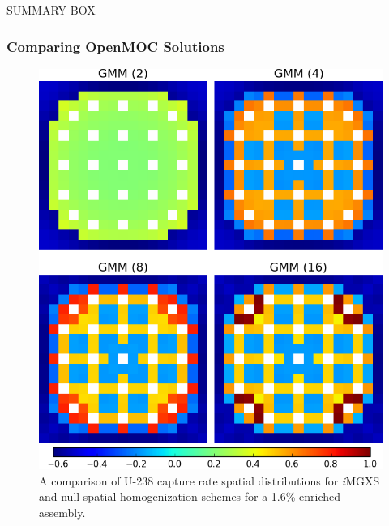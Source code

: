 \clearpage

SUMMARY BOX

\subsubsection{Comparing OpenMOC Solutions}
\label{subsec:chap11-imgxs-capt-rates-compare}

\begin{figure}[h!]
\centering
\includegraphics[width=0.9\linewidth]{figures/results/compare/assm-16/compare-capt}
\vspace{2mm}
\caption[U-238 capture rate comparison for a 1.6\% enriched assembly]{A comparison of U-238 capture rate spatial distributions for \textit{i}\ac{MGXS} and null spatial homogenization schemes for a 1.6\% enriched assembly.}
\label{fig:chap11-assm-1.6-capt-rates-comp}
\end{figure}

\clearpage

